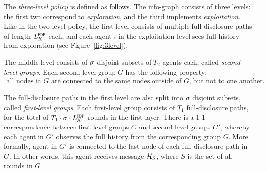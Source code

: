\begin{construction}
The \emph{three-level policy} is defined as follows. The info-graph consists of three levels: the first two correspond to \emph{exploration}, and the third implements \emph{exploitation}. Like in the two-level policy, the first level consists of multiple full-disclosure paths of length $L^\mathtt{FDP}_K$ each, and each agent $t$ in the exploitation level sees full history from exploration  (see Figure~\ref{fig:3level}).

The middle level consists of $\sigma$ disjoint subsets of $T_2$ agents each, called \emph{second-level groups}. Each second-level group $G$ has the following property:
\begin{align}\label{eq:group-defn}
\text{all nodes in $G$ are connected to the same nodes outside of $G$, but not to one another.}
\end{align}


The full-disclosure paths in the first level are also split into $\sigma$ disjoint subsets, called \emph{first-level groups}. Each first-level group consists of $T_1$ full-disclosure paths, for the total of $T_1\cdot \sigma\cdot L^\mathtt{FDP}_K$ rounds in the first layer. There is a 1-1 correspondence between first-level groups $G$ and second-level groups $G'$, whereby each agent in $G'$ observes the full history from the corresponding group $G$. More formally, agent in $G'$ is connected to the last node of each full-disclosure path in $G$. In other words, this agent receives message
    $\mathcal{H}_{S}$,
where $S$ is the set of all rounds in $G$.
\end{construction}
\iffalse

